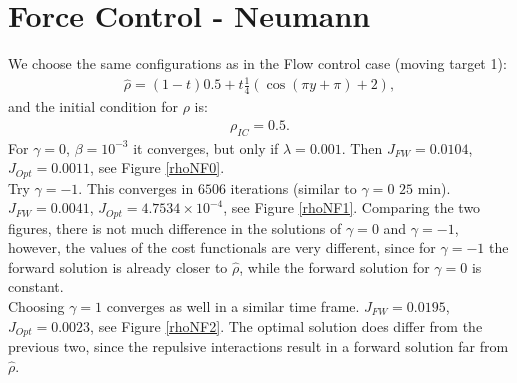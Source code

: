 \documentclass[11pt, a4paper]{article}
\theoremstyle{definition}
\begin{document}
\section{Force Control - Neumann}
We choose the same configurations as in the Flow control case (moving target 1):
\begin{align*}
\hat \rho = (1-t)0.5 + t\frac{1}{4}(\cos(\pi y + \pi) + 2),
\end{align*}
and the initial condition for $\rho$ is:
\begin{align*}
\rho_{IC} = 0.5.
\end{align*}
For $\gamma = 0$, $\beta = 10^{-3}$ it converges, but only if $\lambda = 0.001$. Then $J_{FW} = 0.0104$, $J_{Opt}= 0.0011$, see Figure \ref{rhoNF0}.\\
Try $\gamma = -1$. This converges in $6506$ iterations (similar to $\gamma =0$ $25$ min). $J_{FW} = 0.0041$, $J_{Opt} = 4.7534 \times 10^{-4}$, see Figure \ref{rhoNF1}. Comparing the two figures, there is not much difference in the solutions of $\gamma =0$ and $\gamma = -1$, however, the values of the cost functionals are very different, since for $\gamma =-1$ the forward solution is already closer to $\hat\rho $, while the forward solution for $\gamma =0$ is constant.\\
Choosing $\gamma = 1$ converges as well in a similar time frame. $J_{FW} = 0.0195$, $J_{Opt} = 0.0023$, see Figure \ref{rhoNF2}. The optimal solution does differ from the previous two, since the repulsive interactions result in a forward solution far from $\hat \rho$.
\end{document}
